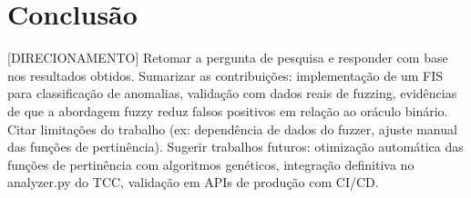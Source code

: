\section{Conclusão}

[DIRECIONAMENTO] Retomar a pergunta de pesquisa e responder com base nos resultados obtidos. Sumarizar as contribuições: implementação de um FIS para classificação de anomalias, validação com dados reais de fuzzing, evidências de que a abordagem fuzzy reduz falsos positivos em relação ao oráculo binário. Citar limitações do trabalho (ex: dependência de dados do fuzzer, ajuste manual das funções de pertinência). Sugerir trabalhos futuros: otimização automática das funções de pertinência com algoritmos genéticos, integração definitiva no analyzer.py do TCC, validação em APIs de produção com CI/CD.
\endinput
